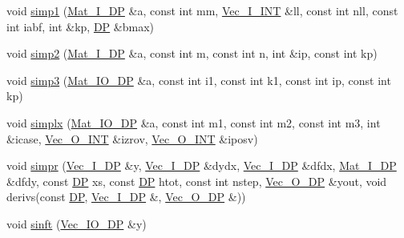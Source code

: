 \begin{DoxyCompactItemize}
\item 
void \mbox{\hyperlink{namespaceNR_aabcc7bcebb2a9ffcefb8231216a3b2bf}{simp1}} (\mbox{\hyperlink{namespaceNR_a2b8abfda8fffad6ba0a1b5a4c0773dbf}{Mat\+\_\+\+I\+\_\+\+DP}} \&a, const int mm, \mbox{\hyperlink{namespaceNR_ae67ce7dc86a8a64a7ce73c3c030ff610}{Vec\+\_\+\+I\+\_\+\+I\+NT}} \&ll, const int nll, const int iabf, int \&kp, \mbox{\hyperlink{namespaceNR_af6ff762dd605ff477b8e52387253a02a}{DP}} \&bmax)
\item 
void \mbox{\hyperlink{namespaceNR_a7f8a4de14a8e48d4a3dd9a913b593f94}{simp2}} (\mbox{\hyperlink{namespaceNR_a2b8abfda8fffad6ba0a1b5a4c0773dbf}{Mat\+\_\+\+I\+\_\+\+DP}} \&a, const int m, const int n, int \&ip, const int kp)
\item 
void \mbox{\hyperlink{namespaceNR_a534aa06bc7a2ffc101eb3606158d7292}{simp3}} (\mbox{\hyperlink{namespaceNR_ad1513aa4697878ed3bff0b8b3c9dd910}{Mat\+\_\+\+I\+O\+\_\+\+DP}} \&a, const int i1, const int k1, const int ip, const int kp)
\item 
void \mbox{\hyperlink{namespaceNR_aef5e28f4e523bd00d12f051bbaa68c26}{simplx}} (\mbox{\hyperlink{namespaceNR_ad1513aa4697878ed3bff0b8b3c9dd910}{Mat\+\_\+\+I\+O\+\_\+\+DP}} \&a, const int m1, const int m2, const int m3, int \&icase, \mbox{\hyperlink{namespaceNR_ade2338f6d53b7da3dd6d1c04804541f2}{Vec\+\_\+\+O\+\_\+\+I\+NT}} \&izrov, \mbox{\hyperlink{namespaceNR_ade2338f6d53b7da3dd6d1c04804541f2}{Vec\+\_\+\+O\+\_\+\+I\+NT}} \&iposv)
\item 
void \mbox{\hyperlink{namespaceNR_ae748fa4c5f015f06df38e8bafc21840f}{simpr}} (\mbox{\hyperlink{namespaceNR_a9f943da53862537c552e2a770cb170ae}{Vec\+\_\+\+I\+\_\+\+DP}} \&y, \mbox{\hyperlink{namespaceNR_a9f943da53862537c552e2a770cb170ae}{Vec\+\_\+\+I\+\_\+\+DP}} \&dydx, \mbox{\hyperlink{namespaceNR_a9f943da53862537c552e2a770cb170ae}{Vec\+\_\+\+I\+\_\+\+DP}} \&dfdx, \mbox{\hyperlink{namespaceNR_a2b8abfda8fffad6ba0a1b5a4c0773dbf}{Mat\+\_\+\+I\+\_\+\+DP}} \&dfdy, const \mbox{\hyperlink{namespaceNR_af6ff762dd605ff477b8e52387253a02a}{DP}} xs, const \mbox{\hyperlink{namespaceNR_af6ff762dd605ff477b8e52387253a02a}{DP}} htot, const int nstep, \mbox{\hyperlink{namespaceNR_a970094d23441f8ef6a45282a7eb2103d}{Vec\+\_\+\+O\+\_\+\+DP}} \&yout, void derivs(const \mbox{\hyperlink{namespaceNR_af6ff762dd605ff477b8e52387253a02a}{DP}}, \mbox{\hyperlink{namespaceNR_a9f943da53862537c552e2a770cb170ae}{Vec\+\_\+\+I\+\_\+\+DP}} \&, \mbox{\hyperlink{namespaceNR_a970094d23441f8ef6a45282a7eb2103d}{Vec\+\_\+\+O\+\_\+\+DP}} \&))
\item 
void \mbox{\hyperlink{namespaceNR_a889e9d27c3d64efbace8e4269ee49396}{sinft}} (\mbox{\hyperlink{namespaceNR_ab293e06a6bf799d8a7ed932b6852bcb8}{Vec\+\_\+\+I\+O\+\_\+\+DP}} \&y)

\end{DoxyCompactItemize}

